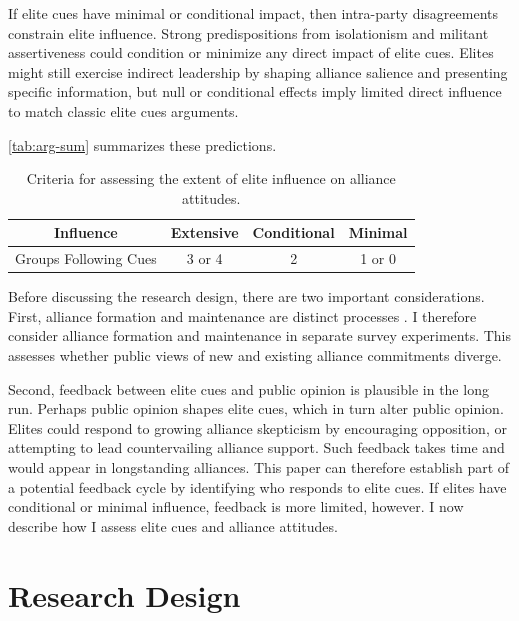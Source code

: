 \documentclass[12pt]{article}
\begin{document}
If elite cues have minimal or conditional impact, then intra-party disagreements constrain elite influence.
Strong predispositions from isolationism and militant assertiveness could condition or minimize any direct impact of elite cues.
Elites might still exercise indirect leadership by shaping alliance salience and presenting specific information, but null or conditional effects imply limited direct influence to match classic elite cues arguments. 


\autoref{tab:arg-sum} summarizes these predictions. 


\begin{table}[hbt!]
\begin{center}
\begin{tabular}{| c | c | c | c |}
\hline
   Influence                  & Extensive & Conditional & Minimal  \\
\hline
   Groups Following Cues  & 3 or 4        & 2 & 1 or 0 \\
\hline
\end{tabular}
\caption{Criteria for assessing the extent of elite influence on alliance attitudes.}
\label{tab:arg-sum}
\end{center} 
\end{table}




Before discussing the research design, there are two important considerations. 
First, alliance formation and maintenance are distinct processes \citep{Snyder1997}. 
I therefore consider alliance formation and maintenance in separate survey experiments.
This assesses whether public views of new and existing alliance commitments diverge. 


Second, feedback between elite cues and public opinion is plausible in the long run. 
Perhaps public opinion shapes elite cues, which in turn alter public opinion. 
Elites could respond to growing alliance skepticism by encouraging opposition, or attempting to lead countervailing alliance support.
Such feedback takes time and would appear in longstanding alliances.
This paper can therefore establish part of a potential feedback cycle by identifying who responds to elite cues.  
If elites have conditional or minimal influence, feedback is more limited, however.
I now describe how I assess elite cues and alliance attitudes. 



\section{Research Design}
\end{document}

